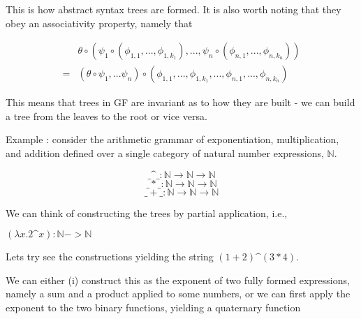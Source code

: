 This is how abstract syntax trees are formed. It is also worth noting that they
obey an associativity property, namely that 

\begin{align*}
&\theta \circ (\psi_1 \circ (\phi_{1,1},...,\phi_{1,k_1}),...,\psi_n \circ
(\phi_{n,1},...,\phi_{n,k_n}))\\ = &(\theta \circ \psi_1,...\psi_n) \circ (\phi_{1,1},...,\phi_{1,k_1},...,\phi_{n,1},...,\phi_{n,k_n})
\end{align*}

This means that trees in GF are invariant as to how they are built - we
can build a tree from the leaves to the root or vice versa.

Example : consider the arithmetic grammar of exponentiation, multiplication, and
addition defined over a single category of natural number expressions,
$\mathds{N}$.

$$\_\^{}\_ : \mathds{N} \to \mathds{N} \to \mathds{N}$$
$$\_*\_ : \mathds{N} \to \mathds{N} \to \mathds{N}$$
$$\_+\_ : \mathds{N} \to \mathds{N} \to \mathds{N}$$

We can think of constructing the trees by partial application, i.e., 

$(\lambda x. 2 \^{} x) : \mathds{N} -> \mathds{N}$

Lets try see the constructions yielding the string $(1 + 2) \^{} (3 * 4)$.

We can either (i) construct this as the exponent of two fully formed expressions,
namely a sum and a product applied to some numbers, or we can first apply the
exponent to the two binary functions, yielding a quaternary function 

